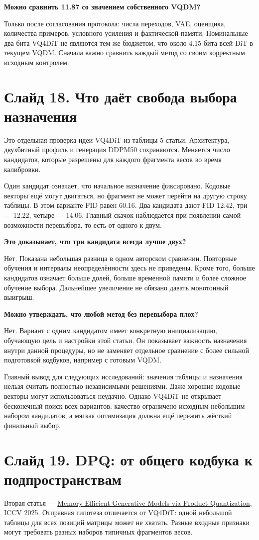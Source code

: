 \documentclass[a4paper,11pt]{article}
\newcommand{\slide}[2]{\clearpage\section*{Слайд #1. #2}}
\newcommand{\question}[1]{\par\textbf{#1}\par}
\begin{document}
\question{Можно сравнить 11.87 со значением собственного VQDM?}
Только после согласования протокола: числа переходов,
VAE, оценщика, количества примеров, условного усиления
и фактической памяти. Номинальные два бита VQ4DiT
не являются тем же бюджетом, что около 4.15 бита
всей DiT в текущем VQDM. Сначала важно сравнить
каждый метод со своим корректным исходным контролем.

\slide{18}{Что даёт свобода выбора назначения}
Это отдельная проверка идеи VQ4DiT из таблицы 5 статьи.
Архитектура, двухбитный профиль и генерация DDPM50
сохраняются. Меняется число кандидатов, которые разрешены
для каждого фрагмента весов во время калибровки.

Один кандидат означает, что начальное назначение фиксировано.
Кодовые векторы ещё могут двигаться, но фрагмент не может
перейти на другую строку таблицы. В этом варианте FID равен 60.16.
Два кандидата дают FID 12.42, три --- 12.22,
четыре --- 14.06. Главный скачок наблюдается при появлении
самой возможности перевыбора, то есть от одного к двум.

\question{Это доказывает, что три кандидата всегда лучше двух?}
Нет. Показана небольшая разница в одном авторском сравнении.
Повторные обучения и интервалы неопределённости здесь не приведены.
Кроме того, больше кандидатов означает больше долей,
больше временной памяти и более сложное обучение выбора.
Дальнейшее увеличение не обязано давать монотонный выигрыш.

\question{Можно утверждать, что любой метод без перевыбора плох?}
Нет. Вариант с одним кандидатом имеет конкретную инициализацию,
обучающую цель и настройки этой статьи. Он показывает
важность назначения внутри данной процедуры,
но не заменяет отдельное сравнение с более сильной
подготовкой кодбуков, например с готовым VQDM.

Главный вывод для следующих исследований: значения таблицы
и назначения нельзя считать полностью независимыми решениями.
Даже хорошие кодовые векторы могут использоваться неудачно.
Однако VQ4DiT не открывает бесконечный поиск всех вариантов:
качество ограничено исходным небольшим набором кандидатов,
а мягкая оптимизация должна ещё пережить жёсткий финальный выбор.

\slide{19}{DPQ: от общего кодбука к подпространствам}
Вторая статья --- \href{https://openaccess.thecvf.com/content/ICCV2025/papers/Shao_Memory-Efficient_Generative_Models_via_Product_Quantization_ICCV_2025_paper.pdf}
{Memory-Efficient Generative Models via Product Quantization}, ICCV 2025.
Отправная гипотеза отличается от VQ4DiT: одной небольшой
таблицы для всех позиций матрицы может не хватать.
Разные входные признаки могут требовать разных наборов
типичных фрагментов весов.
\end{document}

